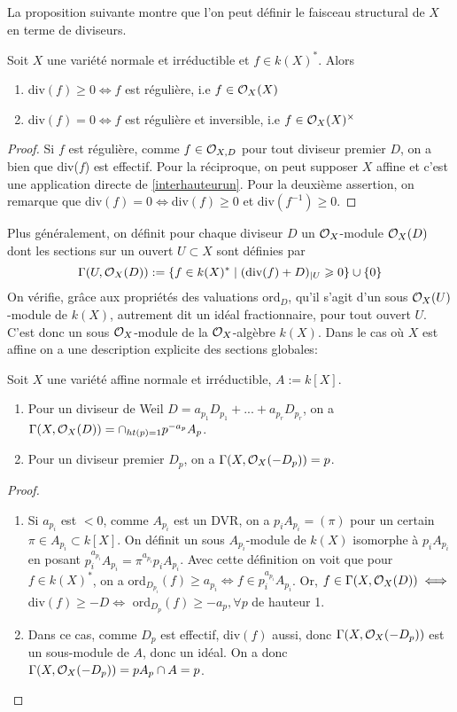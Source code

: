 La proposition suivante montre que l'on peut définir le faisceau structural de $X$ en terme de diviseurs.

\begin{prop}
Soit $X$ une variété normale et irréductible et $f\in k(X)^*$. Alors 
\begin{enumerate}
\item div$(f)\geq 0\iff f$ est régulière, i.e $f\in\mathcal{O}_X(X)$
\item div$(f)= 0\iff f$ est régulière et inversible, i.e $f\in\mathcal{O}_X(X)^\times$
\end{enumerate}
\end{prop}
\begin{proof}
Si $f$ est régulière, comme $f\in \mathcal{O}_{X,D}$ pour tout diviseur premier $D$, on a bien que div($f$) est effectif. Pour la réciproque, on peut supposer $X$ affine et c'est une application directe de \ref{interhauteurun}. Pour la deuxième assertion, on remarque que div$(f)=0\iff$div$(f)\geq 0$ et div$(f^{-1})\geq 0$.
\end{proof}

Plus généralement, on définit pour chaque diviseur $D$ un $\mathcal{O}_X$-module $\mathcal{O}_X(D)$ dont les sections sur un ouvert $U\subset X$ sont définies par $$\Gamma(U,\mathcal{O}_X(D)):=\lbrace f\in k(X)^* \mid (\textrm{div}(f)+D)_{|U}\geqslant 0\rbrace\cup \lbrace 0 \rbrace$$
On vérifie, grâce aux propriétés des valuations ord$_D$, qu'il s'agit d'un sous $\mathcal{O}_X(U)$-module de $k(X)$, autrement dit un idéal fractionnaire, pour tout ouvert $U$. C'est donc un sous $\mathcal{O}_X$-module de la  $\mathcal{O}_X$-algèbre $k(X)$. Dans le cas où $X$ est affine on a une description explicite des sections globales:

\begin{prop}
Soit $X$ une variété affine normale et irréductible, $A:=k[X]$. 
\begin{enumerate}
\item Pour un diviseur de Weil $D=a_{p_1}D_{p_1}+...+a_{p_r}D_{p_r}$, on a $\Gamma(X,\mathcal{O}_X(D))=\cap_{ht(p)=1}p^{-a_p}A_p$.
\item Pour un diviseur premier $D_p$, on a $\Gamma(X,\mathcal{O}_X(-D_p))=p$.
\end{enumerate}
\end{prop}
\begin{proof}
\begin{enumerate}
\item Si $a_{p_i}$ est $<0$, comme $A_{p_i}$ est un DVR, on a $p_iA_{p_i}=(\pi)$ pour un certain $\pi \in A_{p_i}\subset k[X]$. On définit un sous $A_{p_i}$-module de $k(X)$  isomorphe à $p_iA_{p_i}$ en posant $p_i^{a_{p_i}}A_{p_i}=\pi^{a_{p_i}}p_iA_{p_i}$. Avec cette définition on voit que pour $f\in k(X)^*$, on a ord$_{D_{p_i}}(f)\geq a_{p_i} \iff f\in p_i^{a_{p_i}}A_{p_i}$. Or, $f\in \Gamma(X,\mathcal{O}_X(D)) \iff $ div$(f)\geq -D \iff$ ord$_{D_p}(f)\geq -a_p, \forall p$ de hauteur 1.
\item Dans ce cas, comme $D_p$ est effectif, div$(f)$ aussi, donc $\Gamma(X,\mathcal{O}_X(-D_p))$ est un sous-module de $A$, donc un idéal. On a donc $\Gamma(X,\mathcal{O}_X(-D_p))=pA_p\cap A=p$.
\end{enumerate}
\end{proof}

